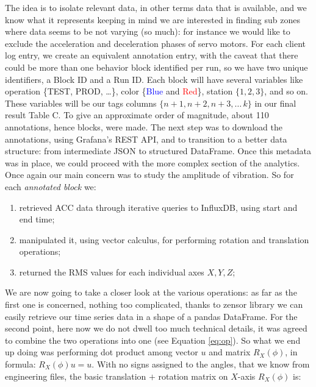 The idea is to isolate relevant data, in other terms data that is available, and we know what it represents keeping in mind we are interested in finding sub zones 
where data seems to be not varying (so much): for instance we would like to exclude the acceleration and deceleration phases of servo motors.
For each client log entry, we create an equivalent annotation entry, with the caveat that there could be more than one behavior block identified per run, so we have two unique identifiers, a Block ID and a Run ID. 
Each block will have several variables like operation \{TEST, PROD, \dots \}, color \{\textcolor{blue}{Blue} and \textcolor{red}{Red}\}, station $\{1,2,3\}$, and so on. 
These variables will be our tags columns $\{n+1, n+2, n+3, \dots\, k\}$ in our final result Table C. To give an approximate order of magnitude, about 110 annotations, hence blocks, were made.
The next step was to download the annotations, using Grafana's REST API, and to transition to a better data structure: from intermediate JSON to structured DataFrame.
Once this metadata was in place, we could proceed with the more complex section of the analytics.
Once again our main concern was to study the amplitude of vibration. So for each \emph{annotated block} we: 
\begin{enumerate}
    \item retrieved ACC data through iterative queries to InfluxDB, using start and end time;
    \item manipulated it, using vector calculus, for performing rotation and translation operations;
    \item returned the \ac{RMS} values for each individual axes $X,Y,Z$;
\end{enumerate}
We are now going to take a closer look at the various operations: %
as far as the first one is concerned, nothing too complicated, thanks to zensor library we can easily retrieve our time series data in a shape of a pandas DataFrame.
For the second point, here now we do not dwell too much technical details, it was agreed to combine the two operations into one (see Equation \ref{eq:op}).
So what we end up doing was performing dot product among vector $u$ and matrix $R_X(\phi)$, in formula: $R_X(\phi)u = u$.
With no signs assigned to the angles, that we know from engineering files, the basic translation $+$ rotation matrix on $X$-axis $R_X(\phi)$ is:
